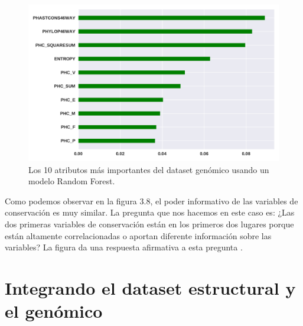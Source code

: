 \begin{figure}[H]
    \centering
    \includegraphics[scale=0.55]{documents/latex/figures/3/importance_2.pdf}
    \caption{Los 10 atributos más importantes del dataset genómico usando un modelo Random Forest. }
    \label{fig:importance_2}
\end{figure}

Como podemos observar en la figura 3.8, el poder informativo de las variables de conservación es muy similar. La pregunta que nos hacemos en este caso es: ¿Las dos primeras variables de conservación están en los primeros dos lugares porque están altamente correlacionadas o aportan diferente información sobre las variables? La figura \todo{[x]} da una respuesta afirmativa a esta pregunta . 




\newpage

\section{Integrando el dataset estructural y el genómico}

